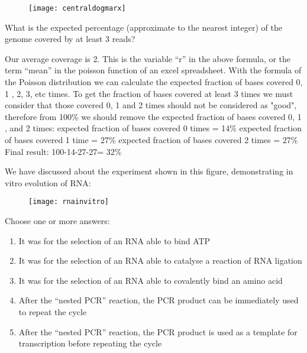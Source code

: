 \begin{Answer} [
  ref={ex41},
  number={1}
 ]

\Question 
\begin{figure}[H]
\centering
\texttt{[image: centraldogmarx]}
\end{figure}

\end{Answer}

\begin{Exercise} [
  label={ex42},
  origin={G. Valle}
 ]

\Question What is the expected percentage (approximate to the nearest integer)
of the genome covered by at least 3 reads?

\end{Exercise}

\begin{Answer} [
  ref={ex42},
  number={1}
 ]

\Question Our average coverage is 2. This is the variable ``r'' in the above
formula, or the term ``mean'' in the poisson function of an excel spreadsheet.
With the formula of the Poisson distribution we can calculate the expected
fraction of bases covered 0, 1 , 2, 3, etc times. To get the fraction of bases
covered at least 3 times we must consider that those covered 0, 1 and 2 times
should not be considered as "good", therefore from 100\% we should remove the
expected fraction of bases covered 0, 1 , and 2 times:
expected fraction of bases covered 0 times = 14\%
expected fraction of bases covered 1 time = 27\%
expected fraction of bases covered 2 times = 27\%
Final result: 100-14-27-27= 32\%
\end{Answer}


\begin{Exercise} [
  label={ex43},
  origin={G. Valle}
 ]

We have discussed about the experiment shown in this figure, demonstrating in
vitro evolution of RNA:

\begin{figure}[H]
\centering
\texttt{[image: rnainvitro]}
\end{figure}

\Question Choose one or more answers:
\begin{enumerate}
\item It was for the selection of an RNA able to bind ATP
\item It was for the selection of an RNA able to catalyse a reaction of RNA
ligation
\item It was for the selection of an RNA able to covalently bind an amino acid
\item After the ``nested PCR'' reaction,  the PCR product can be immediately
used to repeat the cycle
\item After the ``nested PCR'' reaction,  the PCR product is used as a template
for transcription before repeating the cycle 
\end{enumerate}

\end{Exercise}

